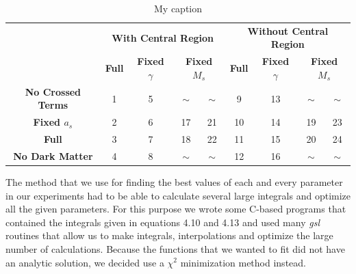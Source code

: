\begin{table}[H]
\centering
\label{my-label}
\begin{tabular}{|c|c|c|c|c|c|c|c|c|}
\hline
\multicolumn{1}{|l|}{\multirow{3}{*}{}} & \multicolumn{4}{c|}{\multirow{2}{*}{\textbf{With Central Region}}}                      & \multicolumn{4}{c|}{\multirow{2}{*}{\textbf{Without Central Region}}}                     \\
\multicolumn{1}{|l|}{}                  & \multicolumn{4}{c|}{}                                                                   & \multicolumn{4}{c|}{}                                                                     \\ \cline{2-9} 
\multicolumn{1}{|l|}{}                  & \textbf{Full}    & \textbf{Fixed $\gamma$}    & \multicolumn{2}{c|}{\textbf{Fixed $M_s$}} & \textbf{Full}     & \textbf{Fixed $\gamma$}     & \multicolumn{2}{c|}{\textbf{Fixed $M_s$}} \\ \hline
\textbf{No Crossed Terms}               & 1                & 5                       & $\sim$               & $\sim$              & 9                 & 13                       & $\sim$               & $\sim$              \\ \hline
\textbf{Fixed $a_s$}                       & 2                & 6                       & 17                   & 21                  & 10                & 14                       & 19                   & 23                  \\ \hline
\textbf{Full}                           & 3                & 7                       & 18                   & 22                  & 11                & 15                       & 20                   & 24                  \\ \hline
\textbf{No Dark Matter}                 & 4                & 8                       & $\sim$               & $\sim$              & 12                & 16                       & $\sim$               & $\sim$              \\ \hline
\end{tabular}
\caption{My caption}
\end{table}

The method that we use for finding the best values of each and every parameter in our experiments had to be able to calculate several large integrals and optimize all the given parameters. For this purpose we wrote some C-based programs that contained the integrals given in equations 4.10 and 4.13 and used many \textit{gsl} routines that allow us to make integrals, interpolations and optimize the large number of calculations. Because the functions that we wanted to fit did not have an analytic solution, we decided use a $\chi^{2}$ minimization method instead. 

